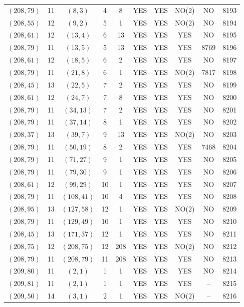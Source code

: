 \begin{longtable}{|c|c|c|c|c|c|c|c|c|c|}
$(208, 79)$ & 11 & $(8, 3)$ & 4 & 8 & YES & YES & NO(2) & NO & 8193\\
$(208, 55)$ & 12 & $(9, 2)$ & 5 & 1 & YES & YES & NO(2) & NO & 8194\\
$(208, 61)$ & 12 & $(13, 4)$ & 6 & 13 & YES & YES & YES & NO & 8195\\
$(208, 79)$ & 11 & $(13, 5)$ & 5 & 13 & YES & YES & YES & 8769 & 8196\\
$(208, 61)$ & 12 & $(18, 5)$ & 6 & 2 & YES & YES & YES & NO & 8197\\
$(208, 79)$ & 11 & $(21, 8)$ & 6 & 1 & YES & YES & NO(2) & 7817 & 8198\\
$(208, 45)$ & 13 & $(22, 5)$ & 7 & 2 & YES & YES & YES & NO & 8199\\
$(208, 61)$ & 12 & $(24, 7)$ & 7 & 8 & YES & YES & YES & NO & 8200\\
$(208, 79)$ & 11 & $(34, 13)$ & 7 & 2 & YES & YES & YES & NO & 8201\\
$(208, 79)$ & 11 & $(37, 14)$ & 8 & 1 & YES & YES & YES & NO & 8202\\
$(208, 37)$ & 13 & $(39, 7)$ & 9 & 13 & YES & YES & NO(2) & NO & 8203\\
$(208, 79)$ & 11 & $(50, 19)$ & 8 & 2 & YES & YES & YES & 7468 & 8204\\
$(208, 79)$ & 11 & $(71, 27)$ & 9 & 1 & YES & YES & YES & NO & 8205\\
$(208, 79)$ & 11 & $(79, 30)$ & 9 & 1 & YES & YES & YES & NO & 8206\\
$(208, 61)$ & 12 & $(99, 29)$ & 10 & 1 & YES & YES & YES & NO & 8207\\
$(208, 79)$ & 11 & $(108, 41)$ & 10 & 4 & YES & YES & YES & NO & 8208\\
$(208, 95)$ & 13 & $(127, 58)$ & 12 & 1 & YES & YES & NO(2) & NO & 8209\\
$(208, 79)$ & 11 & $(129, 49)$ & 10 & 1 & YES & YES & YES & NO & 8210\\
$(208, 45)$ & 13 & $(171, 37)$ & 12 & 1 & YES & YES & YES & NO & 8211\\
$(208, 75)$ & 12 & $(208, 75)$ & 12 & 208 & YES & YES & NO(2) & NO & 8212\\
$(208, 79)$ & 11 & $(208, 79)$ & 11 & 208 & YES & YES & YES & NO & 8213\\
$(209, 80)$ & 11 & $(2, 1)$ & 1 & 1 & YES & YES & YES & NO & 8214\\
$(209, 81)$ & 11 & $(2, 1)$ & 1 & 1 & YES & YES & YES & -- & 8215\\
$(209, 50)$ & 14 & $(3, 1)$ & 2 & 1 & YES & YES & NO(2) & -- & 8216\\

\end{longtable}
